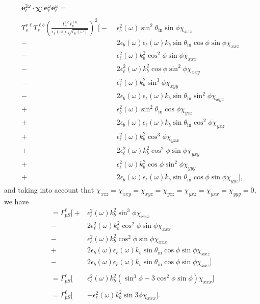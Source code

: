 \begin{equation*}
\begin{split}
\mathbf{e}^{2\omega}_{\ell}
\cdot\boldsymbol{\chi}:
\mathbf{e}^{\omega}_{\ell}\mathbf{e}^{\omega}_{\ell} =
\qquad\qquad\qquad&\\\\
T^{v\ell}_{s}T^{\ell b}_{s}\left(\frac{t^{v\ell}_{p}t^{\ell b}_{p}}
      {\epsilon_{\ell}(\omega)\sqrt{\epsilon_{b}(\omega)}}\right)^{2}
\big[
- &\epsilon_{b}^{2}(\omega)\sin^{2}\theta_{\mathrm{in}}\sin\phi\chi_{xzz}\\
-&2\epsilon_{b}(\omega)\epsilon_{\ell}(\omega)k_{b}\sin\theta_{\mathrm{in}}
   \cos\phi\sin\phi\chi_{xxz}\\
- &\epsilon^{2}_{\ell}(\omega)k^{2}_{b}\cos^{2}\phi\sin\phi\chi_{xxx}\\
-&2\epsilon^{2}_{\ell}(\omega)k^{2}_{b}\cos\phi\sin^{2}\phi\chi_{xxy}\\
- &\epsilon^{2}_{\ell}(\omega)k^{2}_{b}\sin^{3}\phi\chi_{xyy}\\
-&2\epsilon_{b}(\omega)\epsilon_{\ell}(\omega)k_{b}\sin\theta_{\mathrm{in}}
   \sin^{2}\phi\chi_{xyz}\\
+ &\epsilon_{b}^{2}(\omega)\sin^{2}\theta_{\mathrm{in}}\cos\phi\chi_{yzz}\\
+&2\epsilon_{b}(\omega)\epsilon_{\ell}(\omega)k_{b}\sin\theta_{\mathrm{in}}
   \cos^{2}\phi\chi_{yxz}\\
+ &\epsilon^{2}_{\ell}(\omega)k^{2}_{b}\cos^{3}\phi\chi_{yxx}\\
+&2\epsilon^{2}_{\ell}(\omega)k^{2}_{b}\cos^{2}\phi\sin\phi\chi_{yxy}\\
+ &\epsilon^{2}_{\ell}(\omega)k^{2}_{b}\cos\phi\sin^{2}\phi\chi_{yyy}\\
+&2\epsilon_{b}(\omega)\epsilon_{\ell}(\omega)k_{b}\sin\theta_{\mathrm{in}}
   \cos\phi\sin\phi\chi_{yyz}
\big],
\end{split}
\end{equation*}
and taking into account that $\chi_{xzz} = \chi_{xxy} = \chi_{xyz} = \chi_{yzz}
= \chi_{yxz} = \chi_{yxx} = \chi_{yyy} = 0$, we have
\begin{equation*}
\begin{split}
= \Gamma^{\ell}_{pS}
\big[
+ &\epsilon^{2}_{\ell}(\omega)k^{2}_{b}\sin^{3}\phi\chi_{xxx}\\
-&2\epsilon^{2}_{\ell}(\omega)k^{2}_{b}\cos^{2}\phi\sin\phi\chi_{xxx}\\
- &\epsilon^{2}_{\ell}(\omega)k^{2}_{b}\cos^{2}\phi\sin\phi\chi_{xxx}\\
+&2\epsilon_{b}(\omega)\epsilon_{\ell}(\omega)k_{b}\sin\theta_{\mathrm{in}}
   \cos\phi\sin\phi\chi_{xxz}\\
-&2\epsilon_{b}(\omega)\epsilon_{\ell}(\omega)k_{b}\sin\theta_{\mathrm{in}}
   \cos\phi\sin\phi\chi_{xxz}
\big]\\\\
= \Gamma^{\ell}_{pS}
\big[
&\epsilon^{2}_{\ell}(\omega)k^{2}_{b}
(\sin^{3}\phi - 3\cos^{2}\phi\sin\phi)\chi_{xxx}
\big]\\\\
= \Gamma^{\ell}_{pS}
\big[
&-\epsilon^{2}_{\ell}(\omega)k^{2}_{b}
\sin3\phi\chi_{xxx}
\big].
\end{split}
\end{equation*}
